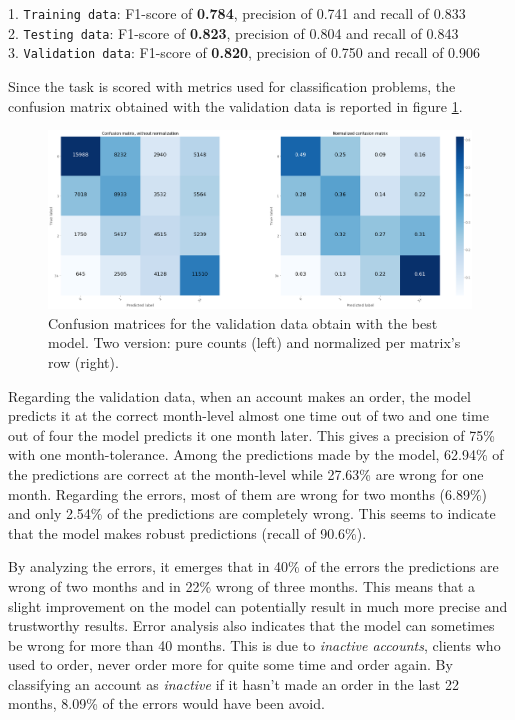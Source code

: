 \noindent\hspace*{0.8cm}  1. \texttt{Training data}:   F1-score of \textbf{0.784}, precision of 0.741 and recall of 0.833 \\
\hspace*{0.8cm}           2. \texttt{Testing data}:    F1-score of \textbf{0.823}, precision of 0.804 and recall of 0.843 \\
\hspace*{0.8cm}           3. \texttt{Validation data}: F1-score of \textbf{0.820}, precision of 0.750 and recall of 0.906

Since the task is scored with metrics used for classification problems, the confusion matrix obtained with the validation data is reported in figure \ref{fig:cf-matrix-validation}.

\begin{figure}[htbp]
    \centering
    \includegraphics[width=15cm]{images/cf-matrix-validation_complete.png}
    \caption[Confusion matrices for validation data]{Confusion matrices for the validation data obtain with the best model. Two version: pure counts (left) and normalized per matrix's row (right).}
    \label{fig:cf-matrix-validation}
\end{figure}

Regarding the validation data, when an account makes an order, the model predicts it at the correct month-level almost one time out of two and one time out of four the model predicts it one month later. This gives a precision of 75\% with one month-tolerance. Among the predictions made by the model, 62.94\% of the predictions are correct at the month-level while 27.63\% are wrong for one month. Regarding the errors, most of them are wrong for two months (6.89\%) and only 2.54\% of the predictions are completely wrong. This seems to indicate that the model makes robust predictions (recall of 90.6\%).

By analyzing the errors, it emerges that in 40\% of the errors the predictions are wrong of two months and in 22\% wrong of three months. This means that a slight improvement on the model can potentially result in much more precise and trustworthy results. Error analysis also indicates that the model can sometimes be wrong for more than 40 months. This is due to \textit{inactive accounts}, clients who used to order, never order more for quite some time and order again. By classifying an account as \textit{inactive} if it hasn't made an order in the last 22 months, 8.09\% of the errors would have been avoid.

